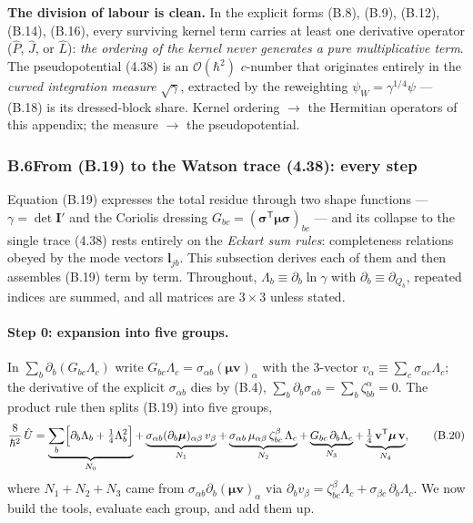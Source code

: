 \textbf{The division of labour is clean.} In the explicit forms (B.8), (B.9), (B.12), (B.14), (B.16), every surviving kernel term carries at least one derivative operator ($\hat P$, $\hat J$, or $\hat L$): \emph{the ordering of the kernel never generates a pure multiplicative term}. The pseudopotential (4.38) is an $\mathcal O(\hbar^2)$ $c$-number that originates entirely in the \emph{curved integration measure} $\sqrt\gamma$, extracted by the reweighting $\psi_W=\gamma^{1/4}\psi$ --- (B.18) is its dressed-block share. Kernel ordering $\rightarrow$ the Hermitian operators of this appendix; the measure $\rightarrow$ the pseudopotential.

\subsubsection*{B.6\quad From (B.19) to the Watson trace (4.38): every step}

Equation (B.19) expresses the total residue through two shape functions --- $\gamma=\det\mathbf I'$ and the Coriolis dressing $G_{bc}=(\boldsymbol\sigma^{\mathsf T}\boldsymbol\mu\boldsymbol\sigma)_{bc}$ --- and its collapse to the single trace (4.38) rests entirely on the \emph{Eckart sum rules}: completeness relations obeyed by the mode vectors $\mathbf l_{jb}$. This subsection derives each of them and then assembles (B.19) term by term. Throughout, $\Lambda_b\equiv\partial_{b}\ln\gamma$ with $\partial_b\equiv\partial_{Q_b}$, repeated indices are summed, and all matrices are $3\times3$ unless stated.

\paragraph{Step 0: expansion into five groups.}
In $\sum_{b}\partial_b(G_{bc}\Lambda_c)$ write $G_{bc}\Lambda_c=\sigma_{\alpha b}(\boldsymbol\mu\mathbf v)_\alpha$ with the 3-vector $v_\alpha\equiv\sum_c\sigma_{\alpha c}\Lambda_c$; the derivative of the explicit $\sigma_{\alpha b}$ dies by (B.4), $\sum_b\partial_b\sigma_{\alpha b}=\sum_b\zeta^\alpha_{bb}=0$. The product rule then splits (B.19) into five groups,
\begin{equation}
\frac{8}{\hbar^{2}}\,\hat U
=\underbrace{\sum_b\Bigl[\partial_b\Lambda_b+\tfrac14\Lambda_b^2\Bigr]}_{N_{0}}
+\underbrace{\sigma_{\alpha b}(\partial_b\boldsymbol\mu)_{\alpha\beta}\,v_\beta}_{N_{1}}
+\underbrace{\sigma_{\alpha b}\,\mu_{\alpha\beta}\,\zeta^{\beta}_{bc}\,\Lambda_c}_{N_{2}}
+\underbrace{G_{bc}\,\partial_b\Lambda_c}_{N_{3}}
+\underbrace{\tfrac14\,\mathbf v^{\mathsf T}\boldsymbol\mu\,\mathbf v}_{N_{4}} , \tag{B.20}
\end{equation}
where $N_1+N_2+N_3$ came from $\sigma_{\alpha b}\partial_b(\boldsymbol\mu\mathbf v)_\alpha$ via $\partial_b v_\beta=\zeta^{\beta}_{bc}\Lambda_c+\sigma_{\beta c}\,\partial_b\Lambda_c$. We now build the tools, evaluate each group, and add them up.

